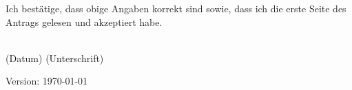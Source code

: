 \documentclass[a4paper,10pt]{scrartcl}
\begin{document}

\vfill
\vfill
Ich bestätige, dass obige Angaben korrekt sind sowie, dass ich die erste Seite des Antrags gelesen und akzeptiert habe.
\vspace{3em}

\hrulefill \\
(Datum) \hfill (Unterschrift) 

\vfill

\enlargethispage{40pt}

\hfill Version: \today
\end{document}
